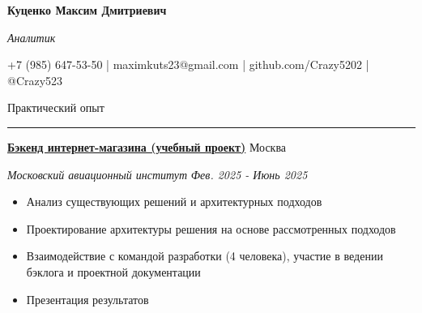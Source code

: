 \documentclass[14pt, a4paper, oneside]{extarticle}
\begin{document}



\begin{center}
    \textbf{\LARGE Куценко Максим Дмитриевич}
    
    \textit{\Large Аналитик}
\end{center}

\begin{center}
	\vspace{-0.5\intextsep}
	\small
    \faPhone* \space +7 (985) 647-53-50 | \faEnvelope \space maximkuts23@gmail.com | \faGithub \space github.com/Crazy5202 | \faTelegram \space @Crazy523
\end{center}


\begin{flushleft}
	\vspace{-\intextsep}
	\large Практический опыт
\end{flushleft}

\vspace{-0.8\intextsep}
\hrule


\begin{flushleft}
	\vspace{-0.8\intextsep}
	\quad
	\href{https://github.com/Crazy5202/eComm}{\textbf{Бэкенд интернет-магазина (учебный проект)}}
	\hfill
	Москва
\end{flushleft}

\begin{flushleft}
	\vspace{-1\intextsep}
	\quad
	\textit{Московский авиационный институт}
	\hfill
	\textit{\small Фев. 2025 - Июнь 2025}
\end{flushleft}


\begin{itemize}
	\vspace{-2\intextsep}
	\item Анализ существующих решений и архитектурных подходов
	\vspace{-0.8\intextsep}
	\item Проектирование архитектуры решения на основе рассмотренных подходов
	\vspace{-0.8\intextsep}
    \item Взаимодействие с командой разработки (4 человека), участие в ведении
    бэклога и проектной документации
    \vspace{-0.8\intextsep}
    \item Презентация результатов
\end{itemize}
\end{document}
